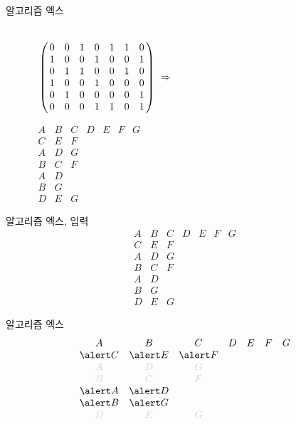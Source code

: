 \documentclass[xcolor=svgnames]{beamer}
\let\a\alert
\def\g{\color{LightGray}}
\begin{document}
%
\begin{frame}{알고리즘 엑스}
  \begin{center}
    \Large\boldmath
    \begin{figure}[!htb]
      \hskip-17mm\begin{minipage}{.7\textwidth}
      \centering
      $\bordermatrix{
        \strut&&&&&&&\cr
        &0&0&1&0&1&1&0\cr
        &1&0&0&1&0&0&1\cr
        &0&1&1&0&0&1&0\cr
        &1&0&0&1&0&0&0\cr
        &0&1&0&0&0&0&1\cr
        &0&0&0&1&1&0&1}\ \Rightarrow$
      \end{minipage}%
      \begin{minipage}{.3\textwidth}
        \centering
        $
        \begin{array}{ccccccc}
          A & B & C & D & E & F & G\\
          C & E & F &&&&\\
          A & D & G &&&&\\
          B & C & F &&&&\\
          A & D &&&&&\\
          B & G &&&&&\\
          D & E & G &&&&
        \end{array}
        $
      \end{minipage}
    \end{figure}
  \end{center}
\end{frame}

\renewcommand\arraystretch{1.2}

%
\begin{frame}{알고리즘 엑스, 입력}
\Large\boldmath
  $$
  \begin{array}{ccccccc}
    A & B & C & D & E & F & G\\
    C & E & F &&&&\\
    A & D & G &&&&\\
    B & C & F &&&&\\
    A & D &&&&&\\
    B & G &&&&&\\
    D & E & G &&&&
  \end{array}
  $$
\end{frame}

%
\begin{frame}{알고리즘 엑스}
\Large\boldmath
$$
  \begin{array}{ccccccc}
    A & B & C & D & E & F & G\\
    \a C & \a E & \a F &&&&\\
    \g A & \g D & \g G &&&&\\
    \g B & \g C & \g F &&&&\\
    \a A & \a D &&&&&\\
    \a B & \a G &&&&&\\
    \g D & \g E & \g G &&&&
  \end{array}
  $$
\end{frame}
\end{document}
